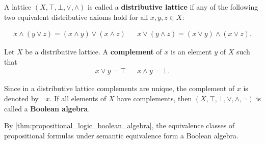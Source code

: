 \begin{definition}\label{def:distributive_lattice}\cite{nLab:distributive_lattice}
  A lattice \( (X, \top, \bot, \lor, \land) \) is called a \textbf{distributive lattice} if any of the following two equivalent distributive axioms hold for all \( x, y, z \in X \):
  \begin{description}
    \begin{align*}
      x \land (y \lor z) = (x \land y) \lor (x \land z)
      &&
      x \lor (y \land z) = (x \lor y) \land (x \lor z).
    \end{align*}
  \end{description}
\end{definition}

\begin{definition}\label{def:boolean_algebra}\cite{nLab:boolean_algebra}
  Let \( X \) be a distributive lattice. A \textbf{complement} of \( x \) is an element \( y \) of \( X \) such that
  \begin{align*}
    x \lor y = \top && x \land y = \bot.
  \end{align*}

  Since in a distributive lattice complements are unique, the complement of \( x \) is denoted by \( \neg x \). If all elements of \( X \) have complements, then \( (X, \top, \bot, \lor, \land, \neg) \) is called a \textbf{Boolean algebra}.
\end{definition}

\begin{example}\label{ex:boolean_algebra}
  By \cref{thm:propositional_logic_boolean_algebra}, the equivalence classes of propositional formulas under semantic equivalence form a Boolean algebra.
\end{example}

